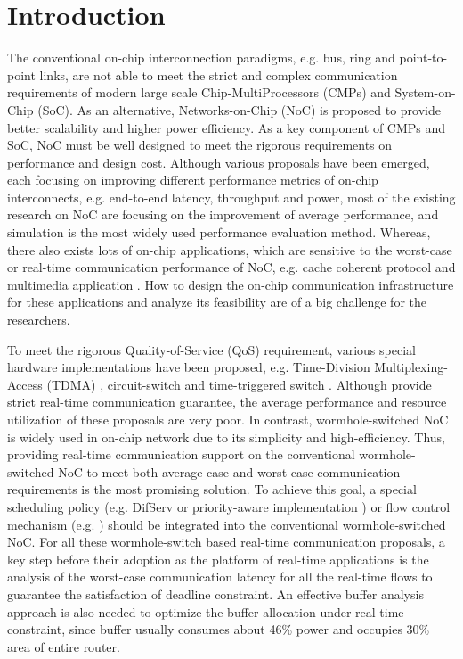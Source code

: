 \documentclass[10pt,journal]{IEEEtran}
\begin{document}
\section{Introduction}
The conventional on-chip interconnection paradigms, e.g. bus, ring and point-to-point links, are not able to meet the strict and complex communication requirements of modern large scale Chip-MultiProcessors (CMPs) and System-on-Chip (SoC). As an alternative, Networks-on-Chip (NoC) is proposed to provide better scalability and higher power efficiency. As a key component of CMPs and SoC, NoC must be well designed to meet the rigorous requirements on performance and design cost. Although various proposals have been emerged, each focusing on improving different performance metrics of on-chip interconnects, e.g. end-to-end latency, throughput and power, most of the existing research on NoC are focusing on the improvement of average performance, and simulation is the most widely used performance evaluation method. Whereas, there also exists lots of on-chip applications, which are sensitive to the worst-case or real-time communication performance of NoC, e.g. cache coherent protocol \cite{Bolotin2007} and multimedia application \cite{ostermann2004video}. How to design the on-chip communication infrastructure for these applications and analyze its feasibility are of a big challenge for the researchers.

To meet the rigorous Quality-of-Service (QoS) requirement, various special hardware implementations have been proposed, e.g. Time-Division Multiplexing-Access (TDMA) \cite{GoDR05}, circuit-switch \cite{6628254} and time-triggered switch \cite{4617280}. Although provide strict real-time communication guarantee, the average performance and resource utilization of these proposals are very poor. In contrast, wormhole-switched NoC is widely used in on-chip network due to its simplicity and high-efficiency. Thus, providing real-time communication support on the conventional wormhole-switched NoC to meet both average-case and worst-case communication requirements is the most promising solution. To achieve this goal, a special scheduling policy (e.g. DifServ \cite{1411140} or priority-aware implementation \cite{Shi:2008:RCA:1397757.1397996}\cite{708526}\cite{627905}) or flow control mechanism (e.g. \cite{Li199649}\cite{707545}) should be integrated into the conventional wormhole-switched NoC. For all these wormhole-switch based real-time communication proposals, a key step before their adoption as the platform of real-time applications is the analysis of the worst-case communication latency for all the real-time flows to guarantee the satisfaction of deadline constraint. An effective buffer analysis approach is also needed to optimize the buffer allocation under real-time constraint, since buffer usually consumes about 46\% power \cite{pkundu} and occupies 30\% area \cite{5507566} of entire router.
\end{document}
